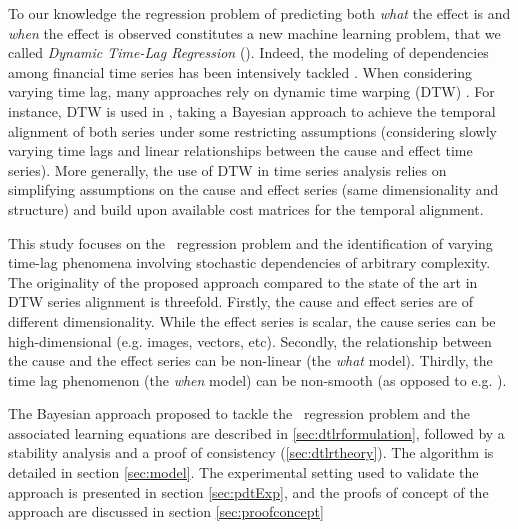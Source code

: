 To our knowledge the regression problem of predicting both {\em what} the effect is and {\em when} 
the effect is observed constitutes a new machine learning problem, that we called 
{\em Dynamic Time-Lag Regression} (\XX). Indeed, the modeling of dependencies among financial time 
series has been intensively tackled \citep{ZHOU2006195}. When considering varying time lag, many 
approaches rely on dynamic time warping (DTW) \citep{SakoeShiba1978}. For instance, DTW is used in 
\citet{SignalDiffusion}, taking a Bayesian approach to achieve the temporal alignment of both 
series under some restricting assumptions (considering slowly varying time lags and linear 
relationships between the cause and effect time series). More generally, the use of DTW in time 
series analysis relies on simplifying assumptions on the cause and effect series 
(same dimensionality and structure) and build upon available cost matrices for the temporal 
alignment. 

This study focuses on the \XX\ regression problem and the identification of varying time-lag 
phenomena involving stochastic dependencies of arbitrary complexity. The originality of the 
proposed approach compared to the state of the art in DTW series alignment is threefold. Firstly, 
the cause and effect series are of different dimensionality. While the effect series is scalar, the 
cause series can be high-dimensional (e.g. images, vectors, etc). Secondly, the relationship 
between the cause and the effect series can be non-linear (the {\em what} model). Thirdly, the time 
lag phenomenon (the {\em when} model) can be non-smooth (as opposed to e.g. \citet{ZHOU2006195}).

The Bayesian approach proposed to tackle the \XX\ regression problem and the associated learning 
equations are described in \cref{sec:dtlrformulation}, followed by a stability analysis and 
a proof of consistency (\cref{sec:dtlrtheory}). The algorithm is detailed in section 
\ref{sec:model}. The experimental setting used to validate the approach is presented in section 
\ref{sec:pdtExp}, and the proofs of concept of the approach are discussed in section 
\ref{sec:proofconcept}

